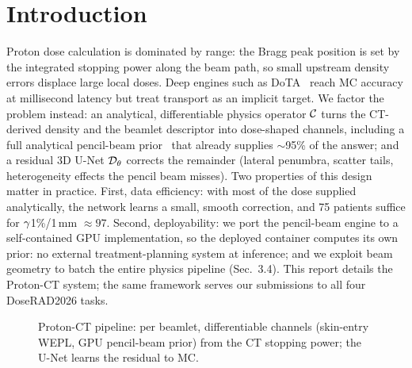 \documentclass{llncs}
\begin{document}
\section{Introduction}
Proton dose calculation is dominated by range: the Bragg peak position is set by the integrated
stopping power along the beam path, so small upstream density errors displace large local doses.
Deep engines such as DoTA~\cite{dota} reach MC accuracy at millisecond latency but treat
transport as an implicit target. We factor the problem instead: an analytical, differentiable
physics operator $\mathcal{C}$ turns the CT-derived density and the beamlet descriptor into dose-shaped
channels, including a full analytical pencil-beam prior~\cite{hong} that already supplies
$\sim$95\% of the answer; and a residual 3D U-Net $\mathcal{D}_\theta$ corrects the remainder (lateral
penumbra, scatter tails, heterogeneity effects the pencil beam misses). Two properties of this
design matter in practice. First, data efficiency: with most of the dose supplied analytically,
the network learns a small, smooth correction, and 75 patients suffice for $\gamma$1\%/1\,mm
$\approx97$. Second, deployability: we port the pencil-beam engine to a self-contained GPU
implementation, so the deployed container computes its own prior: no external
treatment-planning system at inference; and we exploit beam geometry to batch the entire
physics pipeline (Sec.~3.4). This report details the Proton-CT system; the same framework
serves our submissions to all four DoseRAD2026 tasks.

\begin{figure}[t]\centering
{}
\caption{Proton-CT pipeline: per beamlet, differentiable channels (skin-entry WEPL, GPU
pencil-beam prior) from the CT stopping power; the U-Net learns the residual to
MC.}\label{fig:framework}
\end{figure}
\end{document}
